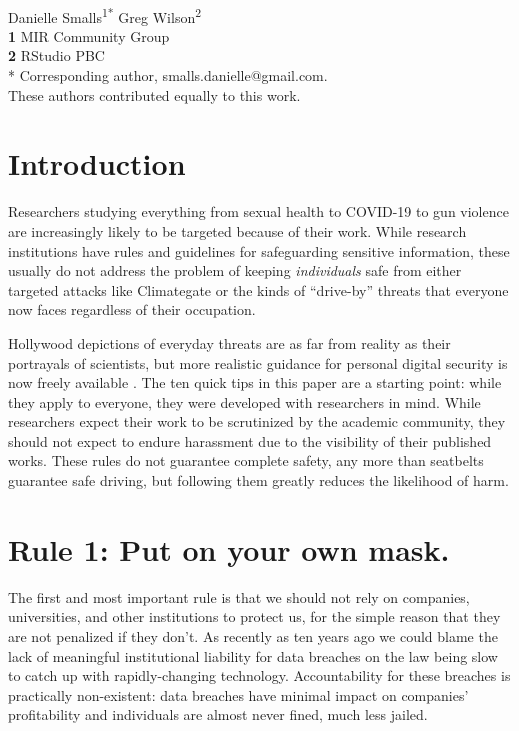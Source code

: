 \documentclass[10pt,letterpaper]{article}
\begin{document}
\vspace*{0.2in}

\begin{flushleft}
{\Large
\textbf{}
}
\newline
\\
{Danielle Smalls}\textsuperscript{1{\ddag}*}
{Greg Wilson}\textsuperscript{2{\ddag}}
\\
\bigskip
\textbf{1} MIR Community Group\\
\textbf{2} RStudio PBC\\
* Corresponding author, smalls.danielle@gmail.com. \\
\bigskip
{\ddag} These authors contributed equally to this work.
\end{flushleft}

\section*{Introduction}

Researchers studying everything from sexual health to COVID-19 to gun violence
are increasingly likely to be targeted because of their work.  While research
institutions have rules and guidelines for safeguarding sensitive information,
these usually do not address the problem of keeping \emph{individuals} safe from
either targeted attacks like Climategate \cite{Natu2010} or the kinds of
``drive-by'' threats that everyone now faces regardless of their occupation.

Hollywood depictions of everyday threats are as far from reality as their
portrayals of scientists, but more realistic guidance for personal digital
security is now freely available \cite{FLD,EFJ2015,EFF}. The ten quick tips in
this paper are a starting point: while they apply to everyone, they were
developed with researchers in mind. While researchers expect their work to be
scrutinized by the academic community, they should not expect to endure
harassment due to the visibility of their published works. These rules do not
guarantee complete safety, any more than seatbelts guarantee safe driving, but
following them greatly reduces the likelihood of harm.

\section*{Rule 1: Put on your own mask.}

The first and most important rule is that we should not rely on companies,
universities, and other institutions to protect us, for the simple reason that
they are not penalized if they don't. As recently as ten years ago we could
blame the lack of meaningful institutional liability for data breaches on the
law being slow to catch up with rapidly-changing technology. Accountability for
these breaches is practically non-existent: data breaches have minimal impact on
companies' profitability and individuals are almost never fined, much less
jailed.
\end{document}
